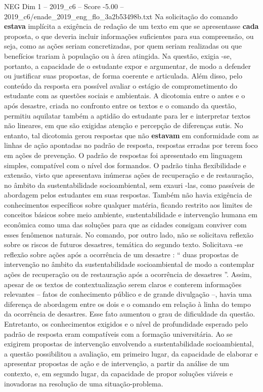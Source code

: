 \begin{textsample}{NEG Dim 1 – 2019\_c6 – Score -5.00 – 2019\_c6/enade\_2019\_eng\_flo\_3a2b53498b.txt}
Na solicitação do comando \textbf{estava} implícita a exigência de redação de um texto em que se apresentasse \textbf{cada} proposta, o que deveria incluir informações suficientes para sua compreensão, ou seja, como as ações seriam concretizadas, por quem seriam realizadas ou que benefícios trariam à população ou à área atingida.
Na questão, exigia -se, portanto, a capacidade de o estudante expor e argumentar, de modo a defender ou justificar suas propostas, de forma coerente e articulada.
Além disso, pelo conteúdo da resposta era possível avaliar o estágio de comprometimento do estudante com as questões sociais e ambientais.
A dicotomia entre o antes e o após desastre, criada no confronto entre os textos e o comando da questão, permitiu aquilatar também a aptidão do estudante para ler e interpretar textos não lineares, em que são exigidas atenção e percepção de diferenças sutis.
No entanto, tal dicotomia gerou respostas que não \textbf{estavam} em conformidade com as linhas de ação apontadas no padrão de resposta, respostas erradas por terem foco em ações de prevenção.
O padrão de respostas foi apresentado em linguagem simples, compatível com o nível dos formandos.
O padrão tinha flexibilidade e extensão, visto que apresentava inúmeras ações de recuperação e de restauração, no âmbito da sustentabilidade socioambiental, sem exauri -las, como passíveis de abordagem pelos estudantes em suas respostas.
Também não havia exigência de conhecimentos específicos sobre qualquer matéria, ficando restrito aos limites de conceitos básicos sobre meio ambiente, sustentabilidade e intervenção humana em econômica como uma das soluções para que as cidades consigam conviver com esses fenômenos naturais.
No comando, por outro lado, não se solicitava reflexão sobre os riscos de futuros desastres, temática do segundo texto.
Solicitava -se reflexão sobre ações após a ocorrência de um desastre : “ duas propostas de intervenção no âmbito da sustentabilidade socioambiental de modo a contemplar ações de recuperação ou de restauração após a ocorrência de desastres ”.
Assim, apesar de os textos de contextualização serem claros e conterem informações relevantes – fatos de conhecimento público e de grande divulgação –, havia uma diferença de abordagem entre os dois e o comando em relação à linha do tempo da ocorrência de desastres.
Esse fato aumentou o grau de dificuldade da questão.
Entretanto, os conhecimentos exigidos e o nível de profundidade esperado pelo padrão de resposta eram compatíveis com a formação universitária.
Ao se exigirem propostas de intervenção envolvendo a sustentabilidade socioambiental, a questão possibilitou a avaliação, em primeiro lugar, da capacidade de elaborar e apresentar propostas de ação e de intervenção, a partir da análise de um contexto, e, em segundo lugar, da capacidade de propor soluções viáveis e inovadoras na resolução de uma situação-problema.

\end{textsample}

